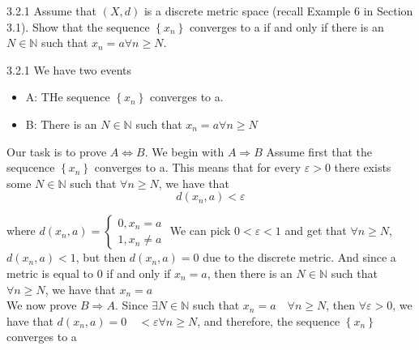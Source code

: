 \documentclass[a4paper,norsk]{article}
\renewcommand{\geq}{\geqslant}
\renewcommand{\epsilon}{\varepsilon}
\begin{document}
\begin{oppgavebox}{3.2.1}{}
Assume that $(X, d)$ is a discrete metric space (recall Example 6 in Section 3.1). Show that the sequence $ \left\{ x_n \right\} $ converges to a if and only if there is an $ N \in \mathbb{N} $  such that $ x_n = a \forall n \geq N $. 

\begin{proofbox}{3.2.1}{}
  We have two events 
  \begin{itemize}
    \item A: THe sequence $ \left\{ x_n \right\}  $ converges to a. 
    \item B: There is an $ N \in \mathbb{N} $ such that $ x_n = a\forall n \geq N $ 
  \end{itemize}
  Our task is to prove $ A \iff B $. We begin with $ A \Rightarrow B $  Assume first that the sequcence $ \left\{ x_n \right\}  $ converges to a. This means that for every $ \epsilon > 0 $ there exists some $ N \in \mathbb{N} $ such that $ \forall n \geq N $, we have that 
  \[
      d(x_n, a) < \epsilon 
  \]

  where $ d(x_n, a) = \begin{cases}
    0, x_n =a \\
    1, x_n \neq a
  \end{cases} $ 
  We can pick $ 0 < \epsilon < 1 $ and get that $ \forall n \geq N $, $ d(x_n, a) < 1 $, but then $ d(x_n, a) = 0 $ due to the discrete metric. And since a metric is equal to 0 if and only if $ x_n = a $, then there is an $ N \in  \mathbb{N} $ such that $ \forall n \geq N $, we have that $ x_n = a $         \\

  We now prove $ B \Rightarrow A $. Since $ \exists N \in  \mathbb{N} $ such that $ x_n = a \quad \forall n \geq N $, then $ \forall \epsilon > 0 $, we have that  $ d(x_n, a) = 0 \quad < \epsilon  \forall n \geq N$, and therefore, the sequence $ \left\{ x_n \right\}  $ converges to a
\end{proofbox}
\end{oppgavebox}
\end{document}
